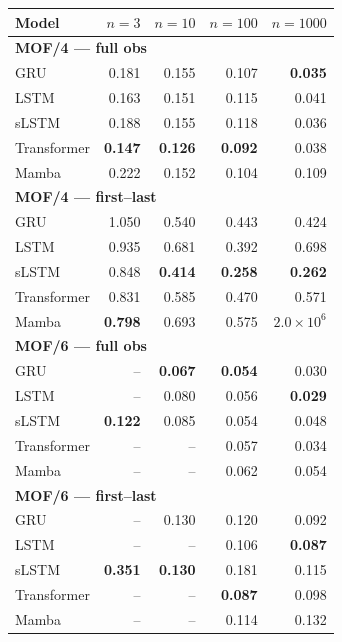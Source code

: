 \begin{tabular*}{\linewidth}{@{\extracolsep{\fill}}lrrrr}
\toprule
Model & $n=3$ & $n=10$ & $n=100$ & $n=1000$ \\
\midrule
\multicolumn{5}{l}{\textbf{MOF/4 — full obs}} \\
GRU & 0.181 & 0.155 & 0.107 & \textbf{0.035} \\
LSTM & 0.163 & 0.151 & 0.115 & 0.041 \\
sLSTM & 0.188 & 0.155 & 0.118 & 0.036 \\
Transformer & \textbf{0.147} & \textbf{0.126} & \textbf{0.092} & 0.038 \\
Mamba & 0.222 & 0.152 & 0.104 & 0.109 \\
\midrule
\multicolumn{5}{l}{\textbf{MOF/4 — first--last}} \\
GRU & 1.050 & 0.540 & 0.443 & 0.424 \\
LSTM & 0.935 & 0.681 & 0.392 & 0.698 \\
sLSTM & 0.848 & \textbf{0.414} & \textbf{0.258} & \textbf{0.262} \\
Transformer & 0.831 & 0.585 & 0.470 & 0.571 \\
Mamba & \textbf{0.798} & 0.693 & 0.575 & $2.0\!\times\!10^{6}$ \\
\midrule
\multicolumn{5}{l}{\textbf{MOF/6 — full obs}} \\
GRU & -- & \textbf{0.067} & \textbf{0.054} & 0.030 \\
LSTM & -- & 0.080 & 0.056 & \textbf{0.029} \\
sLSTM & \textbf{0.122} & 0.085 & 0.054 & 0.048 \\
Transformer & -- & -- & 0.057 & 0.034 \\
Mamba & -- & -- & 0.062 & 0.054 \\
\midrule
\multicolumn{5}{l}{\textbf{MOF/6 — first--last}} \\
GRU & -- & 0.130 & 0.120 & 0.092 \\
LSTM & -- & -- & 0.106 & \textbf{0.087} \\
sLSTM & \textbf{0.351} & \textbf{0.130} & 0.181 & 0.115 \\
Transformer & -- & -- & \textbf{0.087} & 0.098 \\
Mamba & -- & -- & 0.114 & 0.132 \\
\bottomrule
\end{tabular*}
